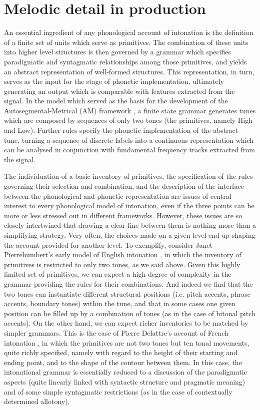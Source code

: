 \chapter[Melodic detail in production]{Melodic detail in production}\label{sec2}
An essential ingredient of any phonological account of intonation is the definition of a finite set of units which serve as primitives. The combination of these units into higher level structures is then governed by a grammar which specifies paradigmatic and syntagmatic relationships among those primitives, and yields an abstract representation of well-formed structures. This representation, in turn, serves as the input for the stage of phonetic implementation, ultimately generating an output which is comparable with features extracted from the signal. In the model which served as the basis for the development of the Autosegmental-Metrical (AM) framework \cite[10]{pierrehumbert1980phonology}, a finite state grammar generates tunes which are composed by sequences of only two tones (the primitives, namely High and Low). Further rules specify the phonetic implementation of the abstract tune, turning a sequence of discrete labels into a continuous representation which can be analysed in conjunction with fundamental frequency tracks extracted from the signal.

The individuation of a basic inventory of primitives, the specification of the rules governing their selection and combination, and the description of the interface between the phonological and phonetic representation are issues of central interest to every phonological model of intonation, even if the three points can be more or less stressed out in different frameworks. However, these issues are so closely intertwined that drawing a clear line between them is nothing more than a simplifying strategy. Very often, the choices made on a given level end up shaping the account provided for another level. To exemplify, consider Janet Pierrehumbert's early model of English intonation \cite[29]{pierrehumbert1980phonology}, in which the inventory of primitives is restricted to only two tones, as we said above. Given this highly limited set of primitives, we can expect a high degree of complexity in the grammar providing the rules for their combinations. And indeed we find that the two tones can instantiate different structural positions (i.e. pitch accents, phrase accents, boundary tones) within the tune, and that in some cases one given position can be filled up by a combination of tones (as in the case of bitonal pitch accents). On the other hand, we can expect richer inventories to be matched by simpler grammars. This is the case of Pierre Delattre's account of French intonation \citep{delattre1966dix}, in which the primitives are not two tones but ten tonal movements, quite richly specified, namely with regard to the height of their starting and ending point, and to the shape of the contour between them. In this case, the intonational grammar is essentially reduced to a discussion of the paradigmatic aspects (quite linearly linked with syntactic structure and pragmatic meaning) and of some simple syntagmatic restrictions (as in the case of contextually determined allotony).

